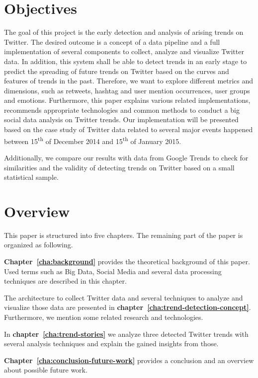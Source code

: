 \section{Objectives}
\label{sec:objectives}
The goal of this project is the early detection and analysis of arising trends on Twitter. The desired outcome is a concept of a data pipeline and a full implementation of several components to collect, analyze and visualize Twitter data. In addition, this system shall be able to detect trends in an early stage to predict the spreading of future trends on Twitter based on the curves and features of trends in the past. Therefore, we want to explore different metrics and dimensions, such as retweets, hashtag and user mention occurrences, user groups and emotions. Furthermore, this paper explains various related implementations, recommends appropriate technologies and common methods to conduct a big social data analysis on Twitter trends. Our implementation will be presented based on the case study of Twitter data related to several major events happened between 15\textsuperscript{th} of December 2014 and 15\textsuperscript{th} of January 2015.

Additionally, we compare our results with data from Google Trends to check for similarities and the validity of detecting trends on Twitter based on a small statistical sample.

\clearpage
\section{Overview}
\label{sec:overview}
This paper is structured into five chapters. The remaining part of the paper is organized as following.

\textbf{Chapter~\ref{cha:background}} provides the theoretical background of this paper. Used terms such as Big Data, Social Media and several data processing techniques are described in this chapter.

The architecture to collect Twitter data and several techniques to analyze and visualize those data are presented in \textbf{chapter~\ref{cha:trend-detection-concept}}. Furthermore, we mention some related research and technologies.

In \textbf{chapter~\ref{cha:trend-stories}} we analyze three detected Twitter trends with several analysis techniques and explain the gained insights from those.

\textbf{Chapter~\ref{cha:conclusion-future-work}} provides a conclusion and an overview about possible future work.
